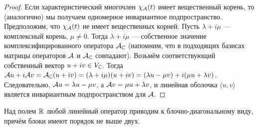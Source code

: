 \begin{proof}
    Если характеристический многочлен $\chi_{\mathcal{A}}(t)$ имеет вещественный корень, то (аналогично) мы получаем одномерное инвариантное подпространство. Предположим, что $\chi_{\mathcal{A}}(t)$ не имеет вещественных корней. Пусть $\lambda + i\mu$ --- комплексный корень, $\mu \ne 0$. Тогда $\lambda + i\mu$ --- собственное значение комплексифицированного оператора $\mathcal{A}_{\mathbb{C}}$ (напомним, что в подходящих базисах матрицы операторов $\mathcal{A}$ и $\mathcal{A}_{\mathbb{C}}$ совпадают). Возьмём соответствующий собственный вектор $u + iv \in V_{\mathbb{C}}$. Тогда $\mathcal{A} u + i\mathcal{A} v = \mathcal{A}_{\mathbb{C}}(u + iv) = (\lambda + i\mu)(u + iv) = (\lambda u - \mu v) + i(\mu u + \lambda v)$. Следовательно, $\mathcal{A} u = \lambda u - \mu v$, а $\mathcal{A} v = \mu u + \lambda v$, и линейная оболочка $\langle u, v\rangle$ является инвариантным подпространством для $\mathcal{A}$.
\end{proof}

\begin{corollary}
    Над полем $\mathbb{R}$ любой линейный оператор приводим к блочно-диагональному виду, причём блоки имеют порядок не выше двух.
\end{corollary}

